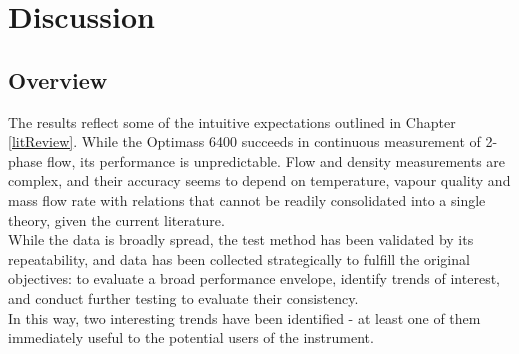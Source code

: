 \documentclass{report}
\begin{document}
\chapter{Discussion} \label{discussion}
\vspace{-1cm}
\section{Overview}
The results reflect some of the intuitive expectations outlined in Chapter \ref{litReview}. While the Optimass 6400 succeeds in continuous measurement of 2-phase flow, its performance is unpredictable. Flow and density measurements are complex, and their accuracy seems to depend on temperature, vapour quality and mass flow rate with relations that cannot be readily consolidated into a single theory, given the current literature.\\
While the data is broadly spread, the test method has been validated by its repeatability, and data has been collected strategically to fulfill the original objectives: to evaluate a broad performance envelope, identify trends of interest, and conduct further testing to evaluate their consistency.\\
In this way, two interesting trends have been identified - at least one of them immediately useful to the potential users of the instrument. \\
\end{document}
